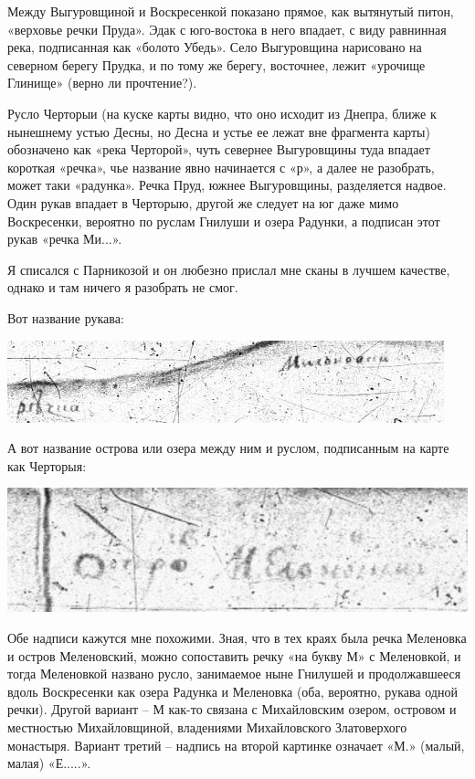 Между Выгуровщиной и Воскресенкой показано прямое, как вытянутый питон, «верховье речки Пруда». Эдак с юго-востока в него впадает, с виду равнинная река, подписанная как «болото Убедь». Село Выгуровщина нарисовано на северном берегу Прудка, и по тому же берегу, восточнее, лежит «урочище Глинище» (верно ли прочтение?).

Русло Черторыи (на куске карты видно, что оно исходит из Днепра, ближе к нынешнему устью Десны, но Десна и устье ее лежат вне фрагмента карты) обозначено как «река Черторой», чуть севернее Выгуровщины туда впадает короткая «речка», чье название явно начинается с «р», а далее не разобрать, может таки «радунка». Речка Пруд, южнее Выгуровщины, разделяется надвое. Один рукав впадает в Черторыю, другой же следует на юг даже мимо Воскресенки, вероятно по руслам Гнилуши и озера Радунки, а подписан этот рукав «речка Ми...». 

Я списался с Парникозой и он любезно прислал мне сканы в лучшем качестве, однако и там ничего я разобрать не смог.

Вот название рукава:

\begin{center}
\includegraphics[width=\linewidth]{chast-gorodki/star-ist/1719-01.jpg}
\end{center}

А вот название острова или озера между ним и руслом, подписанным на карте как Черторыя:

\begin{center}
\includegraphics[width=\linewidth]{chast-gorodki/star-ist/1719-02.jpg}
\end{center}

Обе надписи кажутся мне похожими. Зная, что в тех краях была речка Меленовка и остров Меленовский, можно сопоставить речку «на букву М» с Меленовкой, и тогда Меленовкой названо русло, занимаемое ныне Гнилушей и продолжавшееся вдоль Воскресенки как озера Радунка и Меленовка (оба, вероятно, рукава одной речки). Другой вариант – М как-то связана с Михайловским озером, островом и местностью Михайловщиной, владениями Михайловского Златоверхого монастыря. Вариант третий – надпись на второй картинке означает «М.» (малый, малая) «Е.....».

